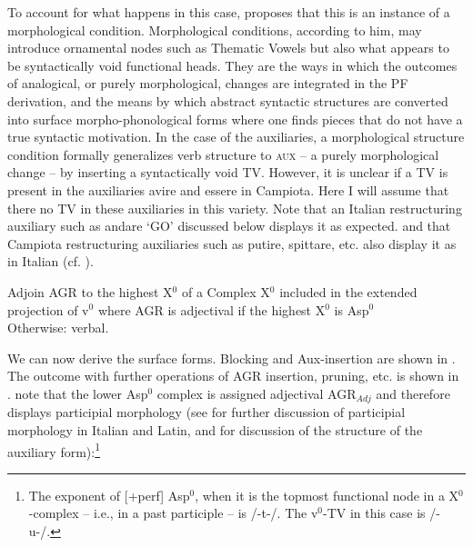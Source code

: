 \documentclass[output=paper]{langscibook}
\begin{document}
{To account for what happens in this case, \cite{calabrese2019a, calabrese2020a} proposes  that this is an instance of a morphological condition. Morphological conditions, according to him, may introduce ornamental nodes such as Thematic Vowels but also what appears to be syntactically void functional heads. They are the ways in which the outcomes of analogical, or purely morphological, changes are integrated in the PF derivation, and the means by which abstract syntactic structures are converted into surface morpho-phonological forms where one finds pieces that do not have a true syntactic motivation. In the case of the auxiliaries, a morphological structure condition formally generalizes verb structure to \textsc{aux} --  a purely morphological change  --  by inserting a syntactically void TV. However, it is unclear if a TV is present in the auxiliaries avire and essere in Campiota. Here I will assume that there no TV in these auxiliaries in this variety.  Note that an Italian restructuring auxiliary such as andare ‘GO’ discussed below displays it as expected. and that Campiota restructuring auxiliaries such as putire, spittare, etc. also display it as in Italian (cf. ).}

\ea \label{ac75} Adjoin AGR to the highest X$^0$ of a Complex X$^0$ included in the extended projection of v$^0$
    \ea \label{ac75a}where AGR is adjectival if the highest X$^0$ is Asp$^0$\\
        Otherwise:
    \ex \label{ac75b}verbal.
   \z 
\z

We can now derive the surface forms. Blocking and Aux-insertion are shown in .  The outcome with further operations of AGR insertion, pruning, etc. is shown in .  note that the lower Asp$^0$ complex is assigned adjectival AGR$_{Adj}$ and therefore displays participial morphology (see \cite{calabrese2020a} for further discussion of participial morphology in Italian and Latin, and \cite{calabrese2019a} for discussion of the structure of the auxiliary form):\footnote{The exponent of [+perf] Asp$^0$, when it is the topmost functional node in a X$^0$-complex -- i.e., in a past participle --  is /-t-/.  The v$^0$-TV in this case is /-u-/.} 
\end{document}
